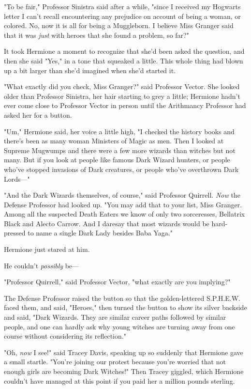 "To be fair," Professor Sinistra said after a while, "since I received my
Hogwarts letter I can't recall encountering any prejudice on account of being a
woman, or colored. No, now it is all for being a Muggleborn. I believe Miss
Granger said that it was \emph{just} with heroes that she found a problem, so
far?"

It took Hermione a moment to recognize that she'd been asked the question, and
then she said "Yes," in a tone that squeaked a little. This whole thing had
blown up a bit larger than she'd imagined when she'd started it.

"What exactly did you check, Miss Granger?" said Professor Vector. She looked
older than Professor Sinistra, her hair starting to grey a little; Hermione
hadn't ever come close to Professor Vector in person until the Arithmancy
Professor had asked her for a button.

"Um," Hermione said, her voice a little high, "I checked the history books and
there's been as many woman Ministers of Magic as men. Then I looked at Supreme
Mugwumps and there were a few more wizards than witches but not many. But if
you look at people like famous Dark Wizard hunters, or people who've stopped
invasions of Dark creatures, or people who've overthrown Dark Lords---"

"And the Dark Wizards themselves, of course," said Professor Quirrell.
\emph{Now} the Defense Professor had looked up. "You may add that to your list,
Miss Granger. Among all the suspected Death Eaters we know of only two
sorceresses, Bellatrix Black and Alecto Carrow. And I daresay that most wizards
would be hard-pressed to name a single Dark Lady besides Baba Yaga."

Hermione just stared at him.

He couldn't \emph{possibly} be---

"Professor Quirrell," said Professor Vector, "what exactly are you implying?"

The Defense Professor raised the button so that the golden-lettered S.P.H.E.W.
faced them, and said, "Heroes," then turned the button to show its silver
backside and said, "Dark Wizards. They are similar career paths followed by
similar people, and one can hardly ask why young witches are turning away from
one course without considering its reflection."

"Oh, \emph{now} I see!" said Tracey Davis, speaking up so suddenly that
Hermione gave a small startle. "You're joining our protest because you're
worried that not enough girls are becoming Dark Witches!" Then Tracey giggled,
which Hermione couldn't have managed at this point if you paid her a million
pounds sterling.

